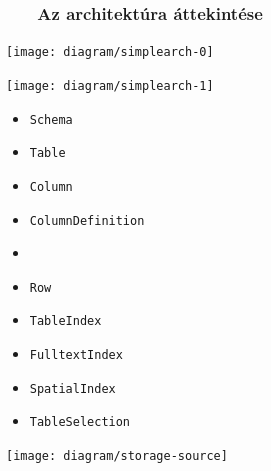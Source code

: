 \documentclass[
    aspectratio=169,
]{beamer}
\newcommand{\slidetitle}[2]{\frametitle{{\small #1 ~ \ding{226} ~ } \normalsize \textbf{#2} }}
\begin{document}
\begin{frame}
    \slidetitle{\sectionshorttitle}{Az architektúra áttekintése}
    
    \centering
    
    \begin{minipage}[c]{0.4\textwidth}
        \begin{overprint}
            \centerline{\texttt{[image: diagram/simplearch-0]}}
            \centerline{\texttt{[image: diagram/simplearch-1]}}
        \end{overprint}
    \end{minipage}%
    \hspace*{\fill}
    \begin{minipage}[c]{0.29\textwidth}
        \begin{overprint}
            \begin{itemize}
                \item \texttt{Schema}
                \item \texttt{Table}
                \item \texttt{Column}
                \item \texttt{ColumnDefinition}
                \item {}
                \item \texttt{Row}
                \item \texttt{TableIndex}
                \item \texttt{FulltextIndex}
                \item \texttt{SpatialIndex}
                \item \texttt{TableSelection}
            \end{itemize}
        \end{overprint}
    \end{minipage}%
    \begin{minipage}[c]{0.29\textwidth}
        \begin{overprint}
            \centerline{\texttt{[image: diagram/storage-source]}}
        \end{overprint}
    \end{minipage}%
    \hspace*{\fill}%
\end{frame}
\end{document}
